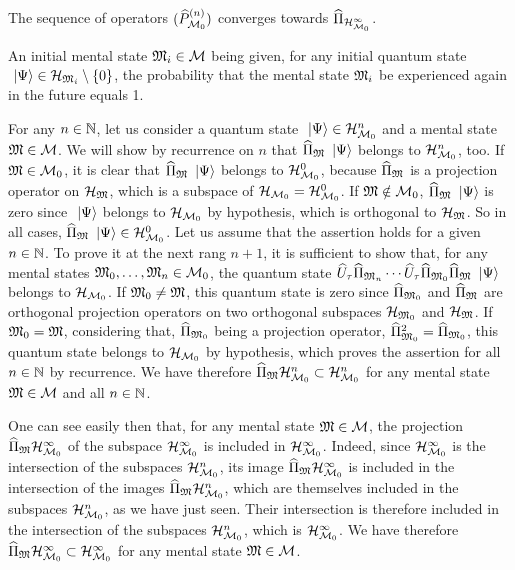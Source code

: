  The sequence of operators $(\widehat{P}_{\mathcal M_0}^{(n)})$ converges towards $\widehat{\Pi}_{\mathcal H_{\mathcal M_0}^\infty}$.

 An initial mental state $\mathfrak{M}_i \in \mathcal M$ being given, for any initial quantum state $\ \left|{\Psi}\right\rangle \in \mathcal H_{\mathfrak{M}_i} \setminus \{0\}$, the probability that the mental state $\mathfrak{M}_i$ be experienced again in the future equals 1.

 For any $n \in \mathbb{N}$, let us consider a quantum state $\ \left|{\Psi}\right\rangle \in \mathcal H_{\mathcal M_0}^n$ and a mental state $\mathfrak{M} \in \mathcal M$. We will show by recurrence on $n$ that $\widehat{\Pi}_{\mathfrak{M}} \ \left|{\Psi}\right\rangle$ belongs to $\mathcal H_{\mathcal M_0}^n$, too. If $\mathfrak{M} \in \mathcal M_0$, it is clear that $\widehat{\Pi}_{\mathfrak{M}} \ \left|{\Psi}\right\rangle$ belongs to $\mathcal H_{\mathcal M_0}^0$, because $\widehat{\Pi}_{\mathfrak{M}}$ is a projection operator on $\mathcal H_{\mathfrak{M}}$, which is a subspace of $\mathcal H_{\mathcal M_0} = \mathcal H_{\mathcal M_0}^0$. If $\mathfrak{M} \notin \mathcal M_0$, $\widehat{\Pi}_{\mathfrak{M}} \ \left|{\Psi}\right\rangle$ is zero since $\ \left|{\Psi}\right\rangle$ belongs to $\mathcal H_{\mathcal M_0}$ by hypothesis, which is orthogonal to $\mathcal H_{\mathfrak{M}}$. So in all cases, $\widehat{\Pi}_{\mathfrak{M}} \ \left|{\Psi}\right\rangle \in \mathcal H_{\mathcal M_0}^0$. Let us assume that the assertion holds for a given $n \in \mathbb{N}$. To prove it at the next rang $n + 1$, it is sufficient to show that, for any mental states $\mathfrak{M}_0, \dotsc, \mathfrak{M}_n \in \mathcal M_0$, the quantum state $\widehat{U}_\tau \widehat{\Pi}_{\mathfrak{M}_n} \dotsm \widehat{U}_\tau \widehat{\Pi}_{\mathfrak{M}_0} \widehat{\Pi}_{\mathfrak{M}} \ \left|{\Psi}\right\rangle$ belongs to $\mathcal H_{\mathcal M_0}$. If $\mathfrak{M}_0 \neq \mathfrak{M}$, this quantum state is zero since $\widehat{\Pi}_{\mathfrak{M}_0}$ and $\widehat{\Pi}_{\mathfrak{M}}$ are orthogonal projection operators on two orthogonal subspaces $\mathcal H_{\mathfrak{M}_0}$ and $\mathcal H_{\mathfrak{M}}$. If $\mathfrak{M}_0 = \mathfrak{M}$, considering that, $\widehat{\Pi}_{\mathfrak{M}_0}$ being a projection operator, $\widehat{\Pi}_{\mathfrak{M}_0}^2 = \widehat{\Pi}_{\mathfrak{M}_0}$, this quantum state belongs to $\mathcal H_{\mathcal M_0}$ by hypothesis, which proves the assertion for all $n \in \mathbb{N}$ by recurrence. We have therefore $\widehat{\Pi}_{\mathfrak{M}} \mathcal H_{\mathcal M_0}^n \subset \mathcal H_{\mathcal M_0}^n$ for any mental state $\mathfrak{M} \in \mathcal M$ and all $n \in \mathbb{N}$.

 One can see easily then that, for any mental state $\mathfrak{M} \in \mathcal M$, the projection $\widehat{\Pi}_{\mathfrak{M}} \mathcal H_{\mathcal M_0}^\infty$ of the subspace $\mathcal H_{\mathcal M_0}^\infty$ is included in $\mathcal H_{\mathcal M_0}^\infty$. Indeed, since $\mathcal H_{\mathcal M_0}^\infty$ is the intersection of the subspaces $\mathcal H_{\mathcal M_0}^n$, its image $\widehat{\Pi}_{\mathfrak{M}} \mathcal H_{\mathcal M_0}^\infty$ is included in the intersection of the images $\widehat{\Pi}_{\mathfrak{M}} \mathcal H_{\mathcal M_0}^n$, which are themselves included in the subspaces $\mathcal H_{\mathcal M_0}^n$, as we have just seen. Their intersection is therefore included in the intersection of the subspaces $\mathcal H_{\mathcal M_0}^n$, which is $\mathcal H_{\mathcal M_0}^\infty$. We have therefore $\widehat{\Pi}_{\mathfrak{M}} \mathcal H_{\mathcal M_0}^\infty \subset \mathcal H_{\mathcal M_0}^\infty$ for any mental state $\mathfrak{M} \in \mathcal M$.

